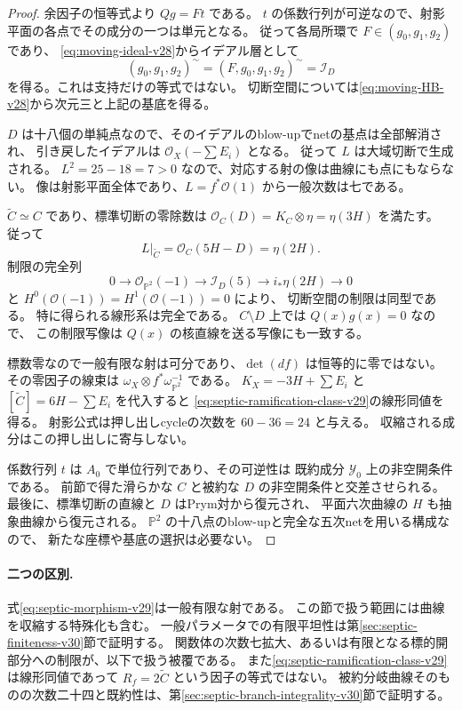 \begin{proof}
余因子の恒等式より $Qg=Ft$ である。
$t$ の係数行列が可逆なので、射影平面の各点でその成分の一つは単元となる。
従って各局所環で $F\in(g_0,g_1,g_2)$ であり、
\eqref{eq:moving-ideal-v28}からイデアル層として
\[
 (g_0,g_1,g_2)^{\sim}
  =(F,g_0,g_1,g_2)^{\sim}=\mathcal I_D
\]
を得る。これは支持だけの等式ではない。
切断空間については\eqref{eq:moving-HB-v28}から次元三と上記の基底を得る。

$D$ は十八個の単純点なので、そのイデアルのblow-upでnetの基点は全部解消され、
引き戻したイデアルは $\mathcal O_X(-\sum E_i)$ となる。
従って $L$ は大域切断で生成される。
$L^2=25-18=7>0$ なので、対応する射の像は曲線にも点にもならない。
像は射影平面全体であり、$L=f^*\mathcal O(1)$ から一般次数は七である。

$\widetilde C\simeq C$ であり、標準切断の零除数は
$\mathcal O_C(D)=K_C\otimes\eta=\eta(3H)$ を満たす。
従って
\[
 L|_{\widetilde C}=\mathcal O_C(5H-D)=\eta(2H).
\]
制限の完全列
\[
 0\longrightarrow\mathcal O_{\mathbb P^2}(-1)
 \longrightarrow\mathcal I_D(5)
 \longrightarrow i_*\eta(2H)\longrightarrow0
\]
と $H^0(\mathcal O(-1))=H^1(\mathcal O(-1))=0$ により、
切断空間の制限は同型である。
特に得られる線形系は完全である。
$C\setminus D$ 上では $Q(x)g(x)=0$ なので、
この制限写像は $Q(x)$ の核直線を送る写像にも一致する。

標数零なので一般有限な射は可分であり、$\det(df)$ は恒等的に零ではない。
その零因子の線束は $\omega_X\otimes f^*\omega_{\mathbb P^2}^{-1}$ である。
$K_X=-3H+\sum E_i$ と $[\widetilde C]=6H-\sum E_i$ を代入すると
\eqref{eq:septic-ramification-class-v29}の線形同値を得る。
射影公式は押し出しcycleの次数を $60-36=24$ と与える。
収縮される成分はこの押し出しに寄与しない。

係数行列 $t$ は $A_0$ で単位行列であり、その可逆性は
既約成分 $\mathcal Y_0$ 上の非空開条件である。
前節で得た滑らかな $C$ と被約な $D$ の非空開条件と交差させられる。
最後に、標準切断の直線と $D$ はPrym対から復元され、
平面六次曲線の $H$ も抽象曲線から復元される。
$\mathbb P^2$ の十八点のblow-upと完全な五次netを用いる構成なので、
新たな座標や基底の選択は必要ない。
\end{proof}

\paragraph{二つの区別.}
式\eqref{eq:septic-morphism-v29}は一般有限な射である。
この節で扱う範囲には曲線を収縮する特殊化も含む。
一般パラメータでの有限平坦性は第\ref{sec:septic-finiteness-v30}節で証明する。
関数体の次数七拡大、あるいは有限となる標的開部分への制限が、以下で扱う被覆である。
また\eqref{eq:septic-ramification-class-v29}は線形同値であって
$R_f=2\widetilde C$ という因子の等式ではない。
被約分岐曲線そのものの次数二十四と既約性は、第\ref{sec:septic-branch-integrality-v30}節で証明する。

